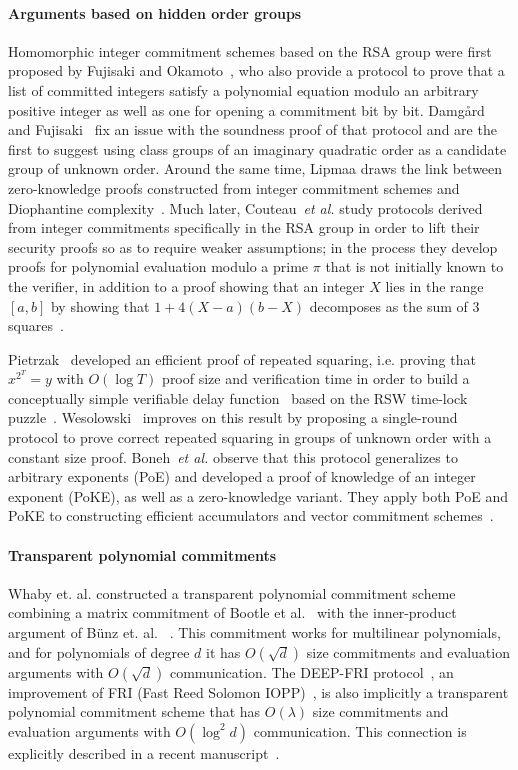 \paragraph{Arguments based on hidden order groups} 
Homomorphic integer commitment schemes based on the RSA group were first proposed by Fujisaki and Okamoto~\cite{C:FujOka97}, who also provide a protocol to prove that a list of committed integers satisfy a polynomial equation modulo an arbitrary positive integer as well as one for opening a commitment bit by bit. Damgård and Fujisaki~\cite{AC:DamFuj02} fix an issue with the soundness proof of that protocol and are the first to suggest using class groups of an imaginary quadratic order as a candidate group of unknown order. Around the same time, Lipmaa draws the link between zero-knowledge proofs constructed from integer commitment schemes and Diophantine complexity~\cite{AC:Lipmaa03b}. Much later, Couteau~\emph{et al.} study protocols derived from integer commitments specifically in the RSA group in order to lift their security proofs so as to require weaker assumptions; in the process they develop proofs for polynomial evaluation modulo a prime $\pi$ that is not initially known to the verifier, in addition to a proof showing that an integer $X$ lies in the range $[a,b]$ by showing that $1+4(X-a)(b-X)$ decomposes as the sum of 3 squares~\cite{EC:CouPetPoi17}.

Pietrzak~\cite{ITCS:Pietrzak18} developed an efficient proof of repeated squaring, i.e. proving that $x^{2^T} = y$ with $O(\log T)$ proof size and verification time in order to build a conceptually simple verifiable delay function~\cite{C:BBBF18} based on the RSW time-lock puzzle~\cite{RivShaWag96}. Wesolowski~\cite{EC:Wesolowski19} improves on this result by proposing a single-round protocol to prove correct repeated squaring in groups of unknown order with a constant size proof. Boneh~\emph{et al.} observe that this protocol generalizes to arbitrary exponents (PoE) and developed a proof of knowledge of an integer exponent (PoKE), as well as a zero-knowledge variant. They apply both PoE and PoKE to constructing efficient accumulators and vector commitment schemes~\cite{C:BonBunFis19}.

\paragraph{Transparent polynomial commitments} 
Whaby et. al. constructed a transparent polynomial commitment scheme combining a matrix commitment of Bootle et al.~\cite{EC:BCCGP16} with the inner-product argument of B\"{u}nz et. al. ~\cite{SP:BBBPWM18}. This commitment works for multilinear polynomials, and for polynomials of degree $d$ it has $O(\sqrt{d})$ size commitments and evaluation arguments with $O(\sqrt{d})$ communication. The DEEP-FRI protocol~\cite{ECCC:BGKS19}, an improvement of FRI (Fast Reed Solomon IOPP)~\cite{ICALP:BBHR18}, is also implicitly a transparent polynomial commitment scheme that has $O(\lambda)$ size commitments and evaluation arguments with $O(\log ^2 d)$ communication. This connection is explicitly described in a recent manuscript~\cite{MatterLabs}. 

